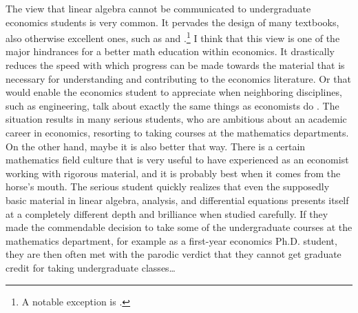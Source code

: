 \documentclass[graybox]{svmult}
\begin{document}
The view that linear algebra cannot be communicated to undergraduate economics students is very common. It pervades the design of many textbooks, also otherwise excellent ones, such as \cite{Sydsaeter2022} and \cite{Sydsaeter2008}.\footnote{A notable exception is \cite{Simon1994}.} I think that this view is one of the major hindrances for a better math education within economics. It drastically reduces the speed with which progress can be made towards the material that is necessary for understanding and contributing to the economics literature. Or that would enable the economics student to appreciate when neighboring disciplines, such as engineering, talk about exactly the same things as economists do \citep{Luenberger1969}. The situation results in many serious students, who are ambitious about an academic career in economics, resorting to taking courses at the mathematics departments. On the other hand, maybe it is also better that way. There is a certain mathematics field culture that is very useful to have experienced as an economist working with rigorous material, and it is probably best when it comes from the horse's mouth. The serious student quickly realizes that even the supposedly basic material in linear algebra, analysis, and differential equations presents itself at a completely different depth and brilliance when studied carefully. If they made the commendable decision to take some of the undergraduate courses at the mathematics department, for example as a first-year economics Ph.D. student, they are then often met with the parodic verdict that they cannot get graduate credit for taking undergraduate classes\ldots
\end{document}
